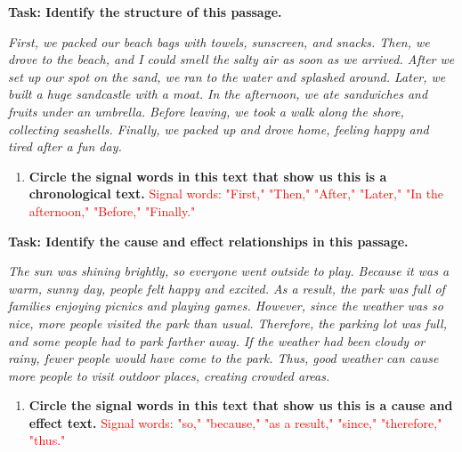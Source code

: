 \documentclass[12pt]{article}
\begin{document}
\begin{tcolorbox}[colframe=black!60, colback=white, 
coltitle=black, colbacktitle=black!15, fonttitle=\bfseries\Large, 
title=Guided Practice 1: Chronology, halign title=center, left=10pt, right=10pt, top=10pt, bottom=15pt]

\textbf{Task: Identify the structure of this passage.}

\textit{First, we packed our beach bags with towels, sunscreen, and snacks. Then, we drove to the beach, and I could smell the salty air as soon as we arrived. After we set up our spot on the sand, we ran to the water and splashed around. Later, we built a huge sandcastle with a moat. In the afternoon, we ate sandwiches and fruits under an umbrella. Before leaving, we took a walk along the shore, collecting seashells. Finally, we packed up and drove home, feeling happy and tired after a fun day.}

\begin{enumerate}
    \item \textbf{Circle the signal words in this text that show us this is a \textbf{chronological} text.}  
    \textcolor{red}{Signal words: "First," "Then," "After," "Later," "In the afternoon," "Before," "Finally."}
\end{enumerate}
\end{tcolorbox}

\vspace{1em}

\begin{tcolorbox}[colframe=black!60, colback=white, 
coltitle=black, colbacktitle=black!15, fonttitle=\bfseries\Large, 
title=Guided Practice 2: Cause and Effect, halign title=center, left=10pt, right=10pt, top=10pt, bottom=15pt]

\textbf{Task: Identify the cause and effect relationships in this passage.}

\textit{The sun was shining brightly, so everyone went outside to play. Because it was a warm, sunny day, people felt happy and excited. As a result, the park was full of families enjoying picnics and playing games. However, since the weather was so nice, more people visited the park than usual. Therefore, the parking lot was full, and some people had to park farther away. If the weather had been cloudy or rainy, fewer people would have come to the park. Thus, good weather can cause more people to visit outdoor places, creating crowded areas.}

\begin{enumerate}
    \item \textbf{Circle the signal words in this text that show us this is a \textbf{cause and effect} text.}  
    \textcolor{red}{Signal words: "so," "because," "as a result," "since," "therefore," "thus."}
\end{enumerate}
\end{tcolorbox}
\end{document}

